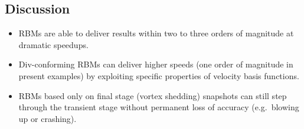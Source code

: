 \documentclass[a0,portrait]{a0poster}
\begin{document}
\begin{multicols}{2}
\section*{\LARGE Discussion}

\begin{itemize}
\item RBMs are able to deliver results within two to three orders of
  magnitude at dramatic speedups.
\item Div-conforming RBMs can deliver higher speeds (one order of
  magnitude in present examples) by exploiting specific properties of
  velocity basis functions.
\item RBMs based only on final stage (vortex shedding) snapshots can
  still step through the transient stage without permanent loss of
  accuracy (e.g.~blowing up or crashing).
\end{itemize}

\end{multicols}
\end{document}
